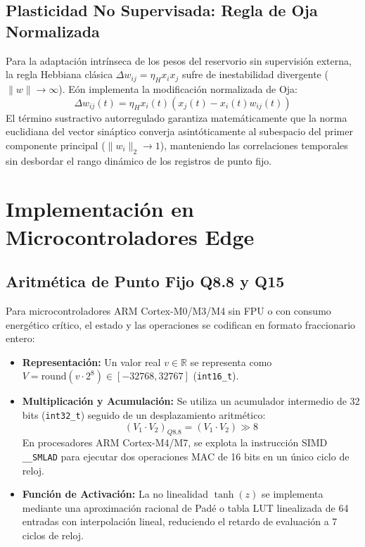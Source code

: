 \documentclass[10pt,twocolumn]{article}
\begin{document}
\subsection{Plasticidad No Supervisada: Regla de Oja Normalizada}

Para la adaptación intrínseca de los pesos del reservorio sin supervisión externa, la regla Hebbiana clásica $\Delta w_{ij} = \eta_{H} x_i x_j$ sufre de inestabilidad divergente ($\|w\| \to \infty$). Eón implementa la modificación normalizada de Oja:
\begin{equation}
\Delta w_{ij}(t) = \eta_{H} x_i(t) \left( x_j(t) - x_i(t) w_{ij}(t) \right)
\label{eq:oja}
\end{equation}
El término sustractivo autorregulado garantiza matemáticamente que la norma euclidiana del vector sináptico converja asintóticamente al subespacio del primer componente principal ($\|w_i\|_2 \to 1$), manteniendo las correlaciones temporales sin desbordar el rango dinámico de los registros de punto fijo.

\section{Implementación en Microcontroladores Edge}

\subsection{Aritmética de Punto Fijo Q8.8 y Q15}

Para microcontroladores ARM Cortex-M0/M3/M4 sin FPU o con consumo energético crítico, el estado y las operaciones se codifican en formato fraccionario entero:
\begin{itemize}
    \item \textbf{Representación:} Un valor real $v \in \mathbb{R}$ se representa como $V = \text{round}(v \cdot 2^8) \in [-32768, 32767]$ (\texttt{int16\_t}).
    \item \textbf{Multiplicación y Acumulación:} Se utiliza un acumulador intermedio de 32 bits (\texttt{int32\_t}) seguido de un desplazamiento aritmético:
    \begin{equation}
    (V_1 \cdot V_2)_{Q8.8} = (V_1 \cdot V_2) \gg 8
    \end{equation}
    En procesadores ARM Cortex-M4/M7, se explota la instrucción SIMD \texttt{\_\_SMLAD} para ejecutar dos operaciones MAC de 16 bits en un único ciclo de reloj.
    \item \textbf{Función de Activación:} La no linealidad $\tanh(z)$ se implementa mediante una aproximación racional de Padé o tabla LUT linealizada de 64 entradas con interpolación lineal, reduciendo el retardo de evaluación a 7 ciclos de reloj.
\end{itemize}
\end{document}
